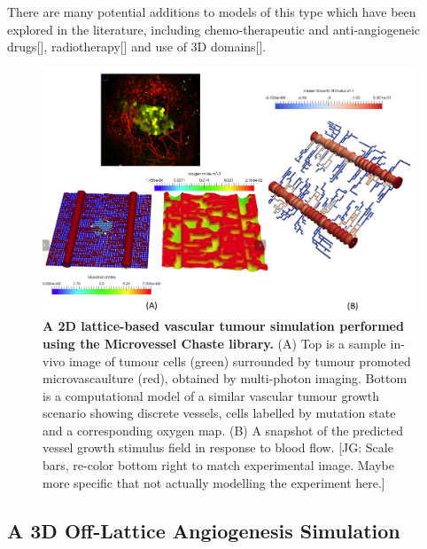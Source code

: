 \documentclass[10pt,letterpaper]{article}
\begin{document}
There are many potential additions to models of this type which have been explored in the literature, including chemo-therapeutic and anti-angiogeneic drugs[], radiotherapy[] and use of 3D domains[].

\begin{figure}[!h]
\centering
\includegraphics[width=0.99\textwidth]{Fig3.png}
\caption{{\bf A 2D lattice-based vascular tumour simulation performed using the Microvessel Chaste library.}
(A) Top is a sample in-vivo image of tumour cells (green) surrounded by tumour promoted microvascaulture (red), obtained by multi-photon imaging. Bottom is a computational model of a similar vascular tumour growth scenario showing discrete vessels, cells labelled by mutation state and a corresponding oxygen map. (B) A snapshot of the predicted vessel growth stimulus field in response to blood flow. [JG: Scale bars, re-color bottom right to match experimental image. Maybe more specific that not actually modelling the experiment here.]}
\label{fig3}
\end{figure}

\subsection*{A 3D Off-Lattice Angiogenesis Simulation}
\end{document}
